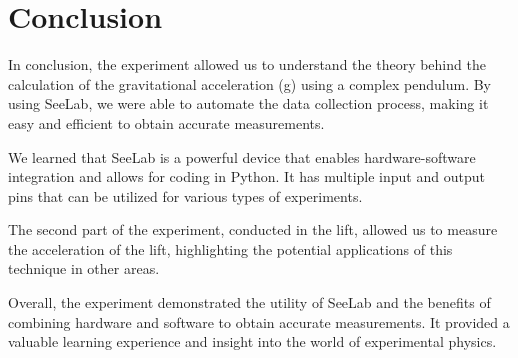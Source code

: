 \section{Conclusion}
	In conclusion, the experiment allowed us to understand the theory behind the calculation of the gravitational acceleration (g) using a complex pendulum. By using SeeLab, we were able to automate the data collection process, making it easy and efficient to obtain accurate measurements.

	We learned that SeeLab is a powerful device that enables hardware-software integration and allows for coding in Python. It has multiple input and output pins that can be utilized for various types of experiments.

	The second part of the experiment, conducted in the lift, allowed us to measure the acceleration of the lift, highlighting the potential applications of this technique in other areas.

	Overall, the experiment demonstrated the utility of SeeLab and the benefits of combining hardware and software to obtain accurate measurements. It provided a valuable learning experience and insight into the world of experimental physics.
